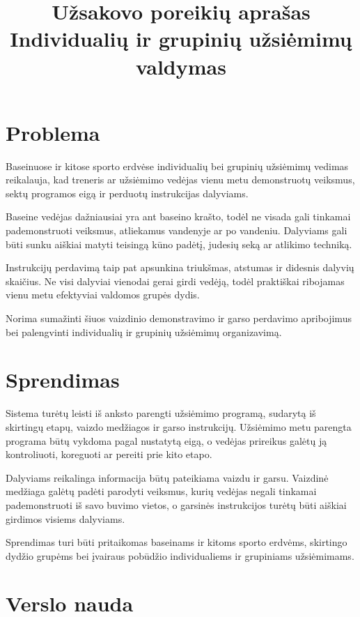 \documentclass[a4paper,11pt]{article}
\title{Užsakovo poreikių aprašas\\\large Individualių ir grupinių užsiėmimų valdymas}
\begin{document}
\maketitle

\section{Problema}

Baseinuose ir kitose sporto erdvėse individualių bei grupinių užsiėmimų vedimas reikalauja, kad treneris ar užsiėmimo vedėjas vienu metu demonstruotų veiksmus, sektų programos eigą ir perduotų instrukcijas dalyviams.

Baseine vedėjas dažniausiai yra ant baseino krašto, todėl ne visada gali tinkamai pademonstruoti veiksmus, atliekamus vandenyje ar po vandeniu. Dalyviams gali būti sunku aiškiai matyti teisingą kūno padėtį, judesių seką ar atlikimo techniką.

Instrukcijų perdavimą taip pat apsunkina triukšmas, atstumas ir didesnis dalyvių skaičius. Ne visi dalyviai vienodai gerai girdi vedėją, todėl praktiškai ribojamas vienu metu efektyviai valdomos grupės dydis.

Norima sumažinti šiuos vaizdinio demonstravimo ir garso perdavimo apribojimus bei palengvinti individualių ir grupinių užsiėmimų organizavimą.

\section{Sprendimas}

Sistema turėtų leisti iš anksto parengti užsiėmimo programą, sudarytą iš skirtingų etapų, vaizdo medžiagos ir garso instrukcijų. Užsiėmimo metu parengta programa būtų vykdoma pagal nustatytą eigą, o vedėjas prireikus galėtų ją kontroliuoti, koreguoti ar pereiti prie kito etapo.

Dalyviams reikalinga informacija būtų pateikiama vaizdu ir garsu. Vaizdinė medžiaga galėtų padėti parodyti veiksmus, kurių vedėjas negali tinkamai pademonstruoti iš savo buvimo vietos, o garsinės instrukcijos turėtų būti aiškiai girdimos visiems dalyviams.

Sprendimas turi būti pritaikomas baseinams ir kitoms sporto erdvėms, skirtingo dydžio grupėms bei įvairaus pobūdžio individualiems ir grupiniams užsiėmimams.

\section{Verslo nauda}
\end{document}
